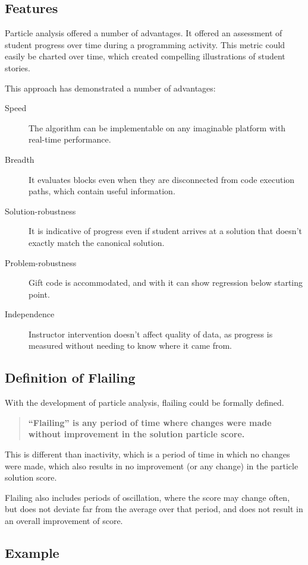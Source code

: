 \subsection{Features}
Particle analysis offered a number of advantages. It offered an assessment of student progress over time during a programming activity. This metric could easily be charted over time, which created compelling illustrations of student stories. 

This approach has demonstrated a number of advantages:
\begin{description}
\item [Speed] The algorithm can be implementable on any imaginable platform with real-time performance. 
\item [Breadth] It evaluates blocks even when they are disconnected from code execution paths, which contain useful information.
\item [Solution-robustness] It is indicative of progress even if student arrives at a solution that doesn't exactly match the canonical solution.
\item [Problem-robustness] Gift code is accommodated, and with it can show regression below starting point.
\item [Independence] Instructor intervention doesn't affect quality of data, as progress is measured without needing to know where it came from.
\end{description}

\subsection{Definition of Flailing}
With the development of particle analysis, flailing could be formally defined. 
\begin{quote}
\textbf{``Flailing'' is any period of time where changes were made without improvement in the solution particle score.}
\end{quote}
This is different than inactivity, which is a period of time in which no changes were made, which also results in no improvement (or any change) in the particle solution score.

Flailing also includes periods of oscillation, where the score may change often, but does not deviate far from the average over that period, and does not result in an overall improvement of score. 


\subsection{Example}

